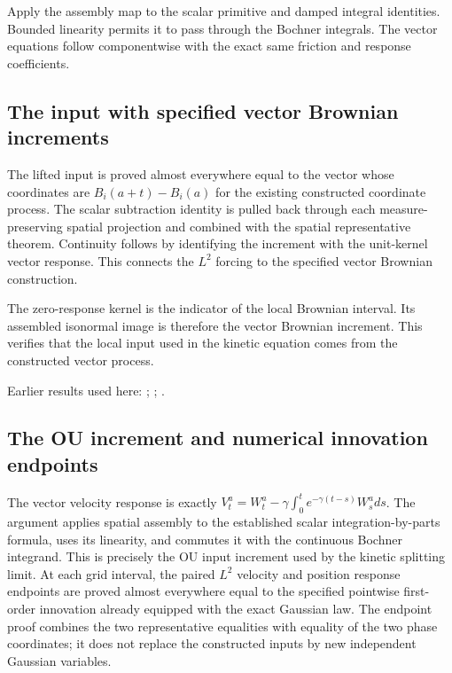 \documentclass[11pt,a4paper]{report}
\begin{document}
Apply the assembly map to the scalar primitive and damped integral identities. Bounded linearity permits it to pass through the Bochner integrals. The vector equations follow componentwise with the exact same friction and response coefficients.

\subsection{\texorpdfstring{The input with specified vector Brownian increments}{The input with specified vector Brownian increments}}
\label{report-step-KineticLangevin-VectorSegmentEquations-lean-4}


The lifted input is proved almost everywhere equal to the vector whose coordinates are \(B_i(a+t)-B_i(a)\) for the existing constructed coordinate process. The scalar subtraction identity is pulled back through each measure-preserving spatial projection and combined with the spatial representative theorem. Continuity follows by identifying the increment with the unit-kernel vector response. This connects the \(L^{2}\) forcing to the specified vector Brownian construction.



The zero-response kernel is the indicator of the local Brownian interval. Its assembled isonormal image is therefore the vector Brownian increment. This verifies that the local input used in the kinetic equation comes from the constructed vector process.



Earlier results used here: \cite[Section~3.8.17]{LangevinLean2026ULASC}; \cite[Section~3.8.18]{LangevinLean2026ULASC}; \cite[Section~3.8.9]{LangevinLean2026ULASC}.
\subsection{\texorpdfstring{The OU increment and numerical innovation endpoints}{The OU increment and numerical innovation endpoints}}
\label{report-step-KineticLangevin-VectorSegmentEquations-lean-5}


The vector velocity response is exactly \(V^a_t=W^a_t-\gamma\int_0^te^{-\gamma(t-s)}W^a_sds\). The argument applies spatial assembly to the established scalar integration-by-parts formula, uses its linearity, and commutes it with the continuous Bochner integrand. This is precisely the OU input increment used by the kinetic splitting limit. At each grid interval, the paired \(L^{2}\) velocity and position response endpoints are proved almost everywhere equal to the specified pointwise first-order innovation already equipped with the exact Gaussian law. The endpoint proof combines the two representative equalities with equality of the two phase coordinates; it does not replace the constructed inputs by new independent Gaussian variables.
\end{document}
